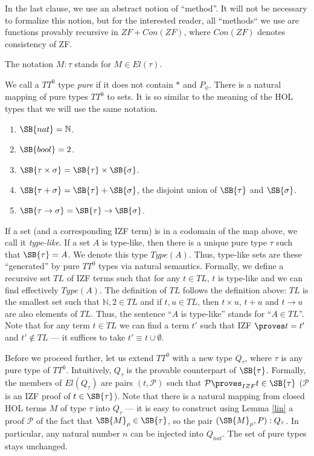 \documentclass{LMCS}
\newcommand{\nat}{\ensuremath{\mathbb{N}}}
\newcommand{\p}{\proves}
\newcommand{\ST}{*}
\newcommand{\pr}[1]{\mathcal{#1}}
\begin{document}
In the last clause, we use an abstract notion of ``method''. It will not be
necessary to formalize this notion, but for the interested reader, 
all ``methods`` we use are functions provably recursive in $ZF + Con(ZF)$,
where $Con(ZF)$ denotes consistency of ZF. 

The notation $M : \tau$ stands for $M \in El(\tau)$. 

We call a $TT^0$ type \emph{pure} if it does not contain $\ST$ and $P_\phi$. There is a natural mapping of pure types $TT^0$ to sets. It is so similar to the
meaning of the HOL types that we will use the same notation.  
\begin{enumerate}[$\bullet$]
\item $\SB{nat} = \nat$.
\item $\SB{bool} = 2$.
\item $\SB{\tau \times \sigma} = \SB{\tau} \times \SB{\sigma}$.
\item $\SB{\tau + \sigma} = \SB{\tau} + \SB{\sigma}$, the disjoint union of
$\SB{\tau}$ and $\SB{\sigma}$. 
\item $\SB{\tau \to \sigma} = \SB{\tau} \to \SB{\sigma}$. 
\end{enumerate}
If a set (and a corresponding IZF term) is in a codomain of the map above, we
call it \emph{type-like}. If a set $A$ is type-like, then there is a unique
pure type $\tau$ such that $\SB{\tau} = A$. We denote this type $Type(A)$.
Thus, type-like sets are these ``generated'' by pure $TT^0$ types via
natural semantics. Formally, we define a recursive set $TL$ of IZF terms
such that for any $t \in TL$, $t$ is type-like and we can find effectively
$Type(A)$. The definition of $TL$ follows the definition above: $TL$ is the
smallest set such that $\nat, 2 \in TL$ and if $t, u \in TL$, then $t \times
u$, $t + u$ and $t \to u$ are also elements of $TL$. Thus, the sentence
``$A$ is type-like'' stands for ``$A \in TL$''. Note that for any term $t
\in TL$ we can find a term $t'$ such that IZF $\p t = t'$ and $t' \notin TL$
--- it suffices to take $t' \equiv t \cup \emptyset$. 

Before we proceed further, let us extend $TT^0$ with a new type $Q_\tau$,
where $\tau$ is any pure type of $TT^0$. Intuitively, $Q_\tau$ is the
provable counterpart of $\SB{\tau}$. Formally, the members of 
$El(Q_\tau)$ are pairs $(t, \pr{P})$ such that $\pr{P} \p_{IZF} t \in \SB{\tau}$ 
($\pr{P}$ is an IZF proof of $t \in \SB{\tau}$). 
Note that there is a natural mapping from closed HOL terms $M$ of type $\tau$ into
$Q_{\tau}$ --- it is easy to construct using Lemma \ref{lin} a proof $\pr{P}$ of
the fact that $\SB{M}_\rho \in \SB{\tau}$, so the pair $(\SB{M}_\rho, P) : Q_\tau$.
In particular, any natural number $n$ can be injected into $Q_{nat}$. The
set of pure types stays unchanged. 
\end{document}

